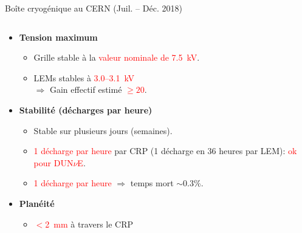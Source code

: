 \begin{frame}{Boîte cryogénique au CERN (Juil. -- Déc. 2018)}
\begin{columns}
\begin{column}{0.6\textwidth}
\begin{scriptsize}
	    			\begin{itemize}
	    				\item \textbf{Tension maximum}
	    				\begin{itemize}
	    					\item Grille stable à la \textcolor{red}{valeur nominale de \SI{7.5}{\kilo\volt}}.
	    					\item LEMs stables à \textcolor{red}{3.0--\SI{3.1}{\kilo\volt}}\\
				    					$\Rightarrow$ Gain effectif estimé \textcolor{red}{$\geq 20$}.
	    				\end{itemize}
	    				\item \textbf{Stabilité (décharges par heure)}
	    				\begin{itemize}
	    					\item Stable sur plusieurs jours (semaines).
	    					\item \textcolor{red}{1 décharge par heure} par CRP (1 décharge en 36 heures par LEM): \textcolor{red}{ok pour DUN$\nu$E}.
	    					\item \textcolor{red}{1 décharge par heure} $\Rightarrow$ temps mort $\sim$0.3\%.
	    				\end{itemize}
	    				\item \textbf{Planéité}
	    				\begin{itemize}
	    					\item \textcolor{red}{$<$\SI{2}{\milli\meter}} à travers le CRP %
	    				\end{itemize}
	    			\end{itemize}
	    		\end{scriptsize}
    		\end{column}
    	\end{columns}
	    \end{frame}


